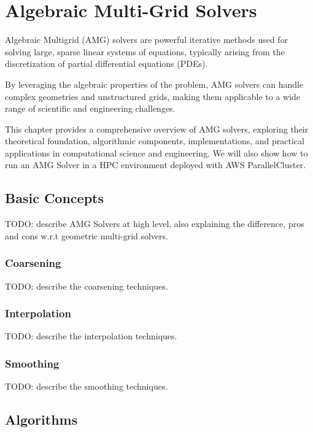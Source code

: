 

\chapter{Algebraic Multi-Grid Solvers}

Algebraic Multigrid (AMG) solvers are powerful iterative methods used for solving large, sparse linear systems of equations, typically arising from the discretization of partial differential equations (PDEs).

By leveraging the algebraic properties of the problem, AMG solvers can handle complex geometries and unstructured grids, making them applicable to a wide range of scientific and engineering challenges.

This chapter provides a comprehensive overview of AMG solvers, exploring their theoretical foundation, algorithmic components, implementations, and practical applications in computational science and engineering. 
We will also show how to run an AMG Solver in a HPC environment deployed with AWS ParallelCluster.

\section{Basic Concepts}

TODO: describe AMG Solvers at high level, also explaining the difference, pros and cons w.r.t geometric multi-grid solvers.

\subsection{Coarsening}

TODO: describe the coarsening techniques.

\subsection{Interpolation}

TODO: describe the interpolation techniques.

\subsection{Smoothing}

TODO: describe the smoothing techniques.

\section{Algorithms}

